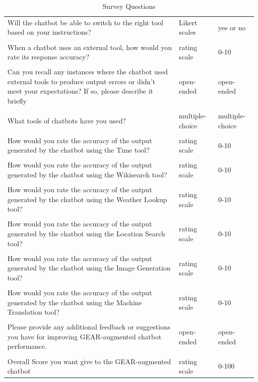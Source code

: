 \documentclass[11pt]{article}
\newcommand{\name}{{\fontfamily{cmss}\selectfont GEAR}}
\begin{document}
\begin{table}[t]
\begin{tabular}{p{}p{}p{}}
Will the chatbot be able to switch to the right tool based on your instructions? & Likert scales & yes or no \\&&\\
When a chatbot uses an external tool, how would you rate its response accuracy? & rating scale & 0-10 \\&&\\
Can you recall any instances where the chatbot used external tools to produce output errors or didn't meet your expectations? If so, please describe it briefly & open-ended & open-ended \\&&\\
What tools of chatbots have you used? & multiple-choice & multiple-choice \\&&\\
How would you rate the accuracy of the output generated by the chatbot using the Time tool? & rating scale             &  0-10 \\&&\\
How would you rate the accuracy of the output generated by the chatbot using the Wikisearch tool? & rating scale             &  0-10 \\&&\\
How would you rate the accuracy of the output generated by the chatbot using the Weather Lookup tool? & rating scale             &  0-10 \\&&\\
How would you rate the accuracy of the output generated by the chatbot using the Location Search tool? & rating scale             &  0-10 \\&&\\
How would you rate the accuracy of the output generated by the chatbot using the Image Generation tool? & rating scale             &  0-10 \\&&\\
How would you rate the accuracy of the output generated by the chatbot using the Machine Translation tool? & rating scale             &  0-10 \\&&\\                                                                            
Please provide any additional feedback or suggestions you have for improving \name{}-augmented chatbot performance. & open-ended & open-ended \\&&\\
Overall Score you want give to the \name{}-augmented chatbot & rating scale & 0-100 \\  \bottomrule
\end{tabular}
\caption{Survey Questions}
\label{table:survery questions}
\end{table}
\end{document}

